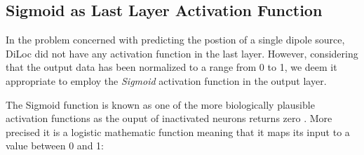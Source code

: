 \documentclass[a4paper, UKenglish, 11pt]{uiomaster}
\begin{document}
%
%
%
%

\subsection{Sigmoid as Last Layer Activation Function}
In the problem concerned with predicting the postion of a single dipole source, DiLoc did not have any activation function in the last layer.
However, considering that the output data has been normalized to a range from 0 to 1, we deem it appropriate to employ the \emph{Sigmoid} activation function in the output layer.

The Sigmoid function is known as one of the more biologically plausible activation functions as the ouput of inactivated neurons returns zero \cite{Jensen2022}. More precised it is a logistic mathematic function meaning that it maps its input to a value between 0 and 1:
\end{document}
